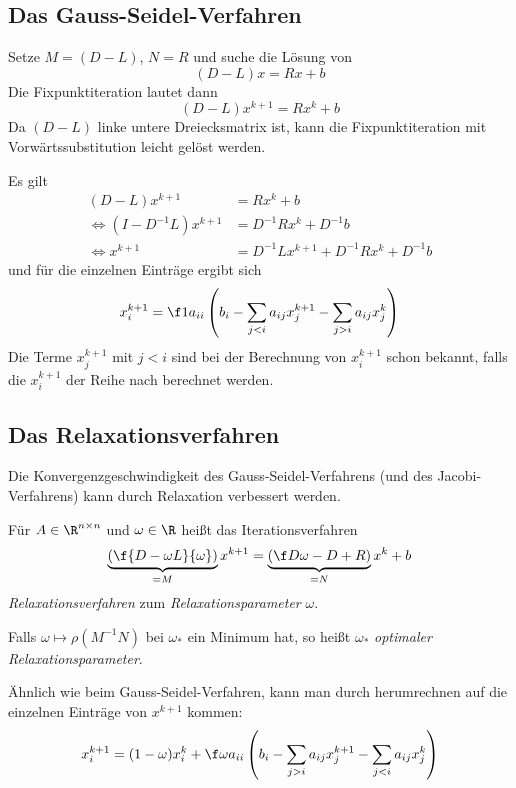 \documentclass[a4paper]{scrartcl}
\numberwithin{equation}{section}
\begin{document}
\subsection{Das Gauss-Seidel-Verfahren}


Setze $M=(D-L)$, $N=R$ und suche die Lösung von
\[
	(D-L)x = Rx + b
\]
Die Fixpunktiteration lautet dann
\[
	(D-L)x^{k+1} = Rx^k +b
\]
Da $(D-L)$ linke untere Dreiecksmatrix ist, kann die Fixpunktiteration mit Vorwärtssubstitution leicht gelöst werden.

Es gilt
\begin{align*}
	(D-L)x^{k+1} &= Rx^k + b \\
	\iff (I-D^{-1}L)x^{k+1} &= D^{-1}Rx^k + D^{-1}b\\
	\iff x^{k+1} &= D^{-1}Lx^{k+1} + D^{-1}Rx^k + D^{-1}b
\end{align*}
und für die einzelnen Einträge ergibt sich
\[
	x_i^{k+1} = \f 1{a_{ii}} \left(b_i - \sum_{j<i}a_{ij}x_j^{k+1} - \sum_{j>i}a_{ij}x_j^k\right)
\]
Die Terme $x_j^{k+1}$ mit $j<i$ sind bei der Berechnung von $x_i^{k+1}$ schon bekannt,
falls die $x_i^{k+1}$ der Reihe nach berechnet werden.



\subsection{Das Relaxationsverfahren}


Die Konvergenzgeschwindigkeit des Gauss-Seidel-Verfahrens (und des Jacobi-Verfahrens) kann durch Relaxation verbessert werden.

\begin{df}
	\label{df:4.9}
	Für $A\in \R^{n\times n}$ und $\omega\in \R$ heißt das Iterationsverfahren
	\[
		\underbrace{\left(\f {D-\omega L}{\omega}\right)}_{=M} x^{k+1} = \underbrace{\left(\f D\omega -D +R\right)}_{=N} x^k +b
	\]
	\emph{Relaxationsverfahren} zum \emph{Relaxationsparameter} $\omega$.

	Falls $\omega \mapsto \rho(M^{-1}N)$ bei $\omega_*$ ein Minimum hat, so heißt $\omega_*$ \emph{optimaler Relaxationsparameter}.
\end{df}

\begin{note}
	Ähnlich wie beim Gauss-Seidel-Verfahren, kann man durch herumrechnen auf die einzelnen Einträge von $x^{k+1}$ kommen:
	\[
		x_i^{k+1} = (1-\omega)x_i^k + \f \omega{a_{ii}}	\left(b_i - \sum_{j>i}a_{ij}x_j^{k+1} - \sum_{j<i}a_{ij}x_j^k\right)
	\]

\end{note}
\end{document}
